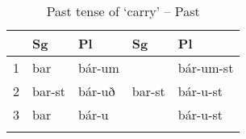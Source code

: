 \documentclass[output=paper]{langscibook}
\begin{document}

%



\begin{table}
\caption{Past tense of  `carry' -- Past} \label{woodbera}

\begin{tabular}{*5{l}}
\lsptoprule
  & {Sg} & {Pl}  & {Sg} & {Pl} \\\midrule
1 & bar & bár-um  	&  			&  bár-um-st \\
2 & bar-st & bár-uð 		& bar-st 	&  bár-u-st  \\
3 & bar  & bár-u 		& 		& bár-u-st  \\\lspbottomrule
\end{tabular}
\end{table}
\end{document}
